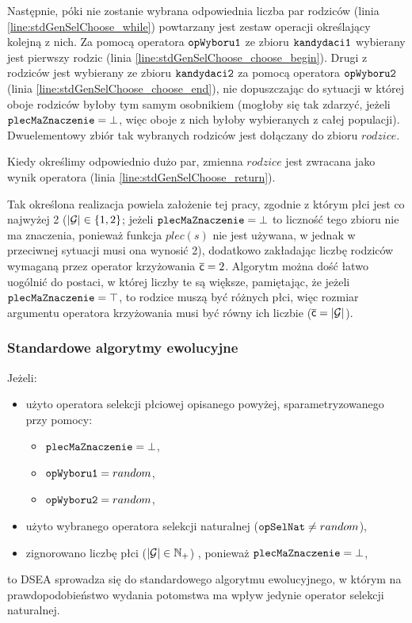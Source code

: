 \documentclass[./FM_mgr.tex]{subfiles}
\begin{document}
Następnie, póki nie zostanie wybrana odpowiednia liczba par rodziców (linia \ref{line:stdGenSelChoose_while}) powtarzany jest zestaw operacji określający kolejną z nich.
Za pomocą operatora $\mathtt{opWyboru1}$ ze zbioru $\mathtt{kandydaci1}$ wybierany jest pierwszy rodzic (linia \ref{line:stdGenSelChoose_choose_begin}).
Drugi z rodziców jest wybierany ze zbioru $\mathtt{kandydaci2}$ za pomocą operatora $\mathtt{opWyboru2}$  (linia \ref{line:stdGenSelChoose_choose_end}), nie dopuszczając do sytuacji w której oboje rodziców byłoby tym samym osobnikiem (mogłoby się tak zdarzyć, jeżeli $\mathtt{plecMaZnaczenie} = \bot$, więc oboje z nich byłoby wybieranych z całej populacji).
Dwuelementowy zbiór tak wybranych rodziców jest dołączany do zbioru $rodzice$.

Kiedy określimy odpowiednio dużo par, zmienna $rodzice$ jest zwracana jako wynik operatora (linia \ref{line:stdGenSelChoose_return}).

Tak określona realizacja powiela założenie tej pracy, zgodnie z którym płci jest co najwyżej 2 ($|\mathcal{G}| \in \{ 1, 2 \}$; jeżeli $\mathtt{plecMaZnaczenie} = \bot$ to liczność tego zbioru nie ma znaczenia, ponieważ funkcja $plec(s)$ nie jest używana, w jednak w przeciwnej sytuacji musi ona wynosić 2), dodatkowo zakładając liczbę rodziców wymaganą przez operator krzyżowania $\mathsf{\overline{c}}=2$.
Algorytm można dość łatwo uogólnić do postaci, w której liczby te są większe, pamiętając, że jeżeli $\mathtt{plecMaZnaczenie} = \top$, to rodzice muszą być różnych płci, więc rozmiar argumentu operatora krzyżowania musi być równy ich liczbie ($\mathsf{\overline{c}} = |\mathcal{G}|$).

\subsubsection{Standardowe algorytmy ewolucyjne}

Jeżeli:
\begin{itemize}
	\item użyto operatora selekcji płciowej opisanego powyżej, sparametryzowanego przy pomocy:
	\begin{itemize}
		\item $\mathtt{plecMaZnaczenie} = \bot$,
		\item $\mathtt{opWyboru1} = random$,
		\item $\mathtt{opWyboru2} = random$,
	\end{itemize}
	\item użyto wybranego operatora selekcji naturalnej ($\mathtt{opSelNat} \neq random$),
	\item zignorowano liczbę płci ($|\mathcal{G}| \in \mathbb{N}_{+}$) , ponieważ $\mathtt{plecMaZnaczenie} = \bot$,
\end{itemize}
to DSEA sprowadza się do standardowego algorytmu ewolucyjnego, w którym na prawdopodobieństwo wydania potomstwa ma wpływ jedynie operator selekcji naturalnej.
\end{document}
